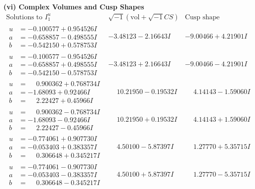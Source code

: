 \documentclass[1p]{elsarticle_modified}
\theoremstyle{definition}
\newcommand{\I}{\sqrt{-1}}
\begin{document}
\newpage\flushleft \textbf{(vi) Complex Volumes and Cusp Shapes}
$$\begin{array}{c|c|c}  
\text{Solutions to }I^u_{1}& \I (\text{vol} + \sqrt{-1}CS) & \text{Cusp shape}\\
 \hline 
\begin{aligned}
u &= -0.100577 + 0.954526 I \\
a &= -0.658857 - 0.498555 I \\
b &= -0.542150 + 0.578753 I\end{aligned}
 & -3.48123 - 2.16643 I & -9.00466 + 4.21901 I \\ \hline\begin{aligned}
u &= -0.100577 - 0.954526 I \\
a &= -0.658857 + 0.498555 I \\
b &= -0.542150 - 0.578753 I\end{aligned}
 & -3.48123 + 2.16643 I & -9.00466 - 4.21901 I \\ \hline\begin{aligned}
u &= \phantom{-}0.900362 + 0.768734 I \\
a &= -1.68093 + 0.92466 I \\
b &= \phantom{-}2.22427 + 0.45966 I\end{aligned}
 & \phantom{-}10.21950 - 0.19532 I & \phantom{-}4.14143 - 1.59060 I \\ \hline\begin{aligned}
u &= \phantom{-}0.900362 - 0.768734 I \\
a &= -1.68093 - 0.92466 I \\
b &= \phantom{-}2.22427 - 0.45966 I\end{aligned}
 & \phantom{-}10.21950 + 0.19532 I & \phantom{-}4.14143 + 1.59060 I \\ \hline\begin{aligned}
u &= -0.774061 + 0.907730 I \\
a &= -0.053403 + 0.383357 I \\
b &= \phantom{-}0.306648 + 0.345217 I\end{aligned}
 & \phantom{-}4.50100 - 5.87397 I & \phantom{-}1.27770 + 5.35715 I \\ \hline\begin{aligned}
u &= -0.774061 - 0.907730 I \\
a &= -0.053403 - 0.383357 I \\
b &= \phantom{-}0.306648 - 0.345217 I\end{aligned}
 & \phantom{-}4.50100 + 5.87397 I & \phantom{-}1.27770 - 5.35715 I \\ \hline\begin{aligned}

\end{aligned}
\end{array}$$
\end{document}

